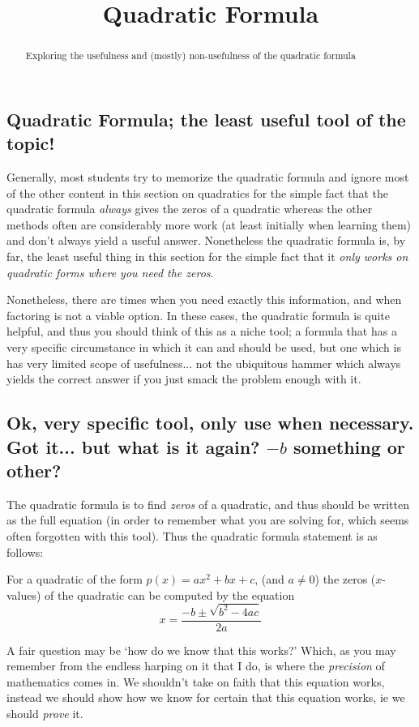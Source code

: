 \documentclass{ximeraXloud}
\title{Quadratic Formula}
\begin{document}
\begin{abstract}
    Exploring the usefulness and (mostly) non-usefulness of the quadratic formula
\end{abstract}
\maketitle

\subsection{Quadratic Formula; the least useful tool of the topic!}

    Generally, most students try to memorize the quadratic formula and ignore most of the other content in this section on quadratics for the simple fact that the quadratic formula \textit{always} gives the zeros of a quadratic whereas the other methods often are considerably more work (at least initially when learning them) and don't always yield a useful answer. Nonetheless the quadratic formula is, by far, the least useful thing in this section for the simple fact that it \textit{only works on quadratic forms where you need the zeros}. 
    
    Nonetheless, there are times when you need exactly this information, and when factoring is not a viable option. In these cases, the quadratic formula is quite helpful, and thus you should think of this as a niche tool; a formula that has a very specific circumstance in which it can and should be used, but one which is has very limited scope of usefulness... not the ubiquitous hammer which always yields the correct answer if you just smack the problem enough with it.

    \subsection*{Ok, very specific tool, only use when necessary. Got it... but what is it again? $-b$ something or other?}
    
        The quadratic formula is to find \textit{zeros} of a quadratic, and thus should be written as the full equation (in order to remember what you are solving for, which seems often forgotten with this tool). Thus the quadratic formula statement is as follows: 
    
        \begin{theorem}
            For a quadratic of the form $p(x) = ax^2 + bx + c$, (and $a \neq 0$) the zeros ($x$-values) of the quadratic can be computed by the equation
            \[
            x = \dfrac{-b \pm \sqrt{b^2 - 4ac}}{2a}
            \]
        \end{theorem}
        A fair question may be `how do we know that this works?' Which, as you may remember from the endless harping on it that I do, is where the \textit{precision} of mathematics comes in. We shouldn't take on faith that this equation works, instead we should show how we know for certain that this equation works, ie we should \textit{prove} it.
        
\end{document}
